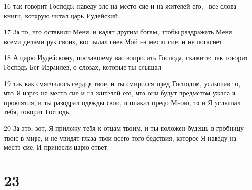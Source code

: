 \par 16 так говорит Господь: наведу зло на место сие и на жителей его, --все слова книги, которую читал царь Иудейский.
\par 17 За то, что оставили Меня, и кадят другим богам, чтобы раздражать Меня всеми делами рук своих, воспылал гнев Мой на место сие, и не погаснет.
\par 18 А царю Иудейскому, пославшему вас вопросить Господа, скажите: так говорит Господь Бог Израилев, о словах, которые ты слышал:
\par 19 так как смягчилось сердце твое, и ты смирился пред Господом, услышав то, что Я изрек на место сие и на жителей его, что они будут предметом ужаса и проклятия, и ты разодрал одежды свои, и плакал предо Мною, то и Я услышал тебя, говорит Господь.
\par 20 За это, вот, Я приложу тебя к отцам твоим, и ты положен будешь в гробницу твою в мире, и не увидят глаза твои всего того бедствия, которое Я наведу на место сие. И принесли царю ответ.

\chapter{23}


